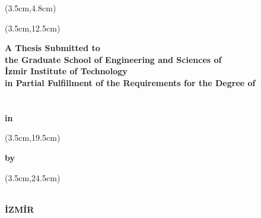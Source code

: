 \thispagestyle{empty}

\begin{center}
	\begin{textblock*}{\textwidth}(3.5cm,4.8cm)
		\textbf{\fontsize{18pt}{27pt}\selectfont\MakeUppercase\ThesisTitle}
	\end{textblock*}

	\begin{textblock*}{\textwidth}(3.5cm,12.5cm)
		\begin{spacing}{1}
			{\fontsize{14}{16}\bf
				A Thesis Submitted to\\
				the Graduate School of Engineering and Sciences of\\
				İzmir Institute of Technology\\
				in Partial Fulfillment of the Requirements for the Degree of\\
				~\\
				~\\
				in \DepartmentName
			}
		\end{spacing}
	\end{textblock*}

	\begin{textblock*}{\textwidth}(3.5cm,19.5cm)
		\begin{spacing}{1}
			{\fontsize{14}{16}\bf
				by\\
				\AuthorName{ }\MakeUppercase\AuthorSurname
			}
		\end{spacing}
	\end{textblock*}

	\begin{textblock*}{\textwidth}(3.5cm,24.5cm)
		\begin{spacing}{1}
			{\fontsize{14}{16}\bf
			\DefenceMonth{ }\DefenceYear\\
				İZMİR
			}
		\end{spacing}
	\end{textblock*}
\end{center}

~\pagebreak
